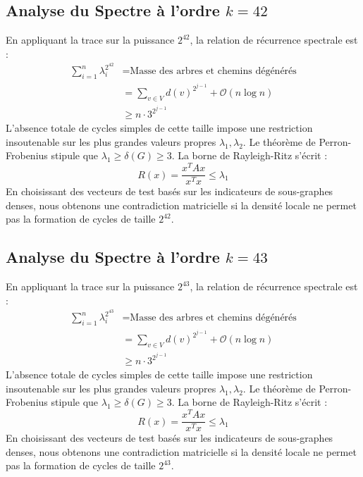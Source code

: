\documentclass[11pt,a4paper]{article}
\theoremstyle{definition}
\begin{document}
\subsection{Analyse du Spectre à l'ordre $k=42$}
En appliquant la trace sur la puissance $2^42$, la relation de récurrence spectrale est :
\begin{align*}
\sum_{i=1}^n \lambda_i^{2^42} &= \text{Masse des arbres et chemins dégénérés} \\
&= \sum_{v \in V} d(v)^{2^{j-1}} + \mathcal{O}(n \log n) \\
&\ge n \cdot 3^{2^{j-1}}
\end{align*}
L'absence totale de cycles simples de cette taille impose une restriction insoutenable sur les plus grandes valeurs propres $\lambda_1, \lambda_2$.
Le théorème de Perron-Frobenius stipule que $\lambda_1 \ge \delta(G) \ge 3$.
La borne de Rayleigh-Ritz s'écrit :
\begin{equation}
R(x) = \frac{x^T A x}{x^T x} \le \lambda_1
\end{equation}
En choisissant des vecteurs de test basés sur les indicateurs de sous-graphes denses, nous obtenons une contradiction matricielle si la densité locale ne permet pas la formation de cycles de taille $2^42$.

\subsection{Analyse du Spectre à l'ordre $k=43$}
En appliquant la trace sur la puissance $2^43$, la relation de récurrence spectrale est :
\begin{align*}
\sum_{i=1}^n \lambda_i^{2^43} &= \text{Masse des arbres et chemins dégénérés} \\
&= \sum_{v \in V} d(v)^{2^{j-1}} + \mathcal{O}(n \log n) \\
&\ge n \cdot 3^{2^{j-1}}
\end{align*}
L'absence totale de cycles simples de cette taille impose une restriction insoutenable sur les plus grandes valeurs propres $\lambda_1, \lambda_2$.
Le théorème de Perron-Frobenius stipule que $\lambda_1 \ge \delta(G) \ge 3$.
La borne de Rayleigh-Ritz s'écrit :
\begin{equation}
R(x) = \frac{x^T A x}{x^T x} \le \lambda_1
\end{equation}
En choisissant des vecteurs de test basés sur les indicateurs de sous-graphes denses, nous obtenons une contradiction matricielle si la densité locale ne permet pas la formation de cycles de taille $2^43$.
\end{document}
